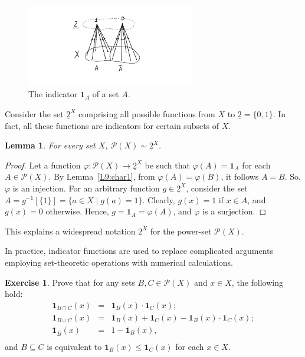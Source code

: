 \documentclass[12pt,notitlepage]{article}
\theoremstyle{plain}
\newtheorem{lemma}[thm]{Lemma}
\theoremstyle{definition}
\newtheorem{exc}[thm]{Exercise}
\theoremstyle{plain}
\newcommand{\sbs}{\subseteq}
\newcommand{\mP}{\mathcal{P}}
\renewcommand{\phi}{\varphi}
\newcommand{\ul}[1]{\underline{#1}}
\newcommand{\1}{\mathbf{1}}
\newcommand{\0}{\mathbf{0}}
\newcommand{\mcomm}[1]{}
\begin{document}
\begin{figure}[h]
\centering
\includegraphics*[width=0.65\textwidth]{ind_func.pdf}
\caption{The indicator $\1_A$ of a set $A$.}
\end{figure}

Consider the set $\ul{2}^X$ comprising all possible functions from $X$ to $\ul{2} = \{0, 1\}$. In fact, all these functions are indicators for certain subsets of $X$.
\begin{lemma}\label{L9:char2}
For every set $X$, $\mP(X) \sim \ul{2}^X$.
\end{lemma}
\begin{proof} 
Let a function $\phi\colon \mP(X) \to \ul{2}^X$ be such that $\phi(A) = \1_A$ for each $A \in \mP(X)$. By  Lemma~\ref{L9:char1}, from $\phi(A) = \phi(B)$, it follows $A = B$. So, $\phi$ is an injection. For an arbitrary function $g \in \ul{2}^X$, consider the set $A = g^{-1}[\{ 1 \}] = \{ a \in X \mid g(a) = 1 \}$. Clearly, $g(x) = 1$ if $x \in A$, and $g(x) = 0$ otherwise. Hence, $g = \1_A = \phi(A)$, and $\phi$ is a surjection.
\end{proof}
\noindent This explains a widespread notation $2^X$ for the power-set $\mP(X)$.

In practice, indicator functions are used to replace complicated arguments employing set-theoretic operations with numerical calculations.
\begin{exc}
Prove that for any sets $B,C \in \mP(X)$ and $x \in X$, the following hold:
$$
\begin{array}{rcl}
\1_{B \cap C}(x) &=& \1_B(x) \cdot \1_C(x);\\
\1_{B \cup C}(x) &=& \1_B(x) + \1_C(x) - \1_B(x) \cdot \1_C(x);\\
\1_{\bar B}(x) &=& 1 - \1_B(x),\\
\end{array}$$
and $B \sbs C$ is equivalent to $\1_B(x) \leq \1_C(x)$ for each $x \in X$.
\end{exc}

\mcomm{In practice, we omit indicators' argument for it typically does not change throughout such proofs.}
\end{document}
